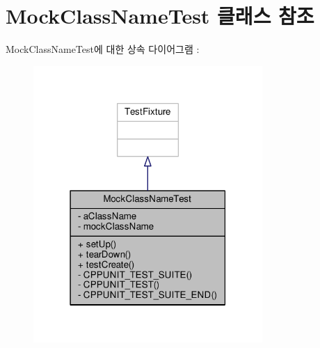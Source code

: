 \hypertarget{class_mock_class_name_test}{}\section{Mock\+Class\+Name\+Test 클래스 참조}
\label{class_mock_class_name_test}


Mock\+Class\+Name\+Test에 대한 상속 다이어그램 \+: 
\nopagebreak
\begin{figure}[H]
\begin{center}
\leavevmode
\includegraphics[width=247pt]{class_mock_class_name_test__inherit__graph}
\end{center}
\end{figure}


